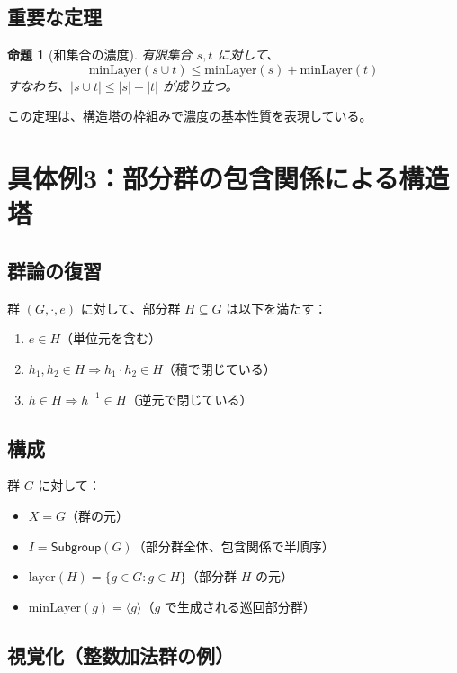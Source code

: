 \documentclass[a4paper,11pt]{ltjsarticle}
\newtheorem{proposition}[theorem]{命題}
\begin{document}
\subsection{重要な定理}

\begin{proposition}[和集合の濃度]
有限集合 $s, t$ に対して、
\[
\text{minLayer}(s \cup t) \leq \text{minLayer}(s) + \text{minLayer}(t)
\]
すなわち、$|s \cup t| \leq |s| + |t|$ が成り立つ。
\end{proposition}

この定理は、構造塔の枠組みで濃度の基本性質を表現している。

\newpage

\section{具体例3：部分群の包含関係による構造塔}

\subsection{群論の復習}

群 $(G, \cdot, e)$ に対して、部分群 $H \subseteq G$ は以下を満たす：
\begin{enumerate}
\item $e \in H$（単位元を含む）
\item $h_1, h_2 \in H \Rightarrow h_1 \cdot h_2 \in H$（積で閉じている）
\item $h \in H \Rightarrow h^{-1} \in H$（逆元で閉じている）
\end{enumerate}

\subsection{構成}

群 $G$ に対して：

\begin{itemize}
\item $X = G$（群の元）
\item $I = \mathsf{Subgroup}(G)$（部分群全体、包含関係で半順序）
\item $\text{layer}(H) = \{g \in G : g \in H\}$（部分群 $H$ の元）
\item $\text{minLayer}(g) = \langle g \rangle$（$g$ で生成される巡回部分群）
\end{itemize}

\subsection{視覚化（整数加法群の例）}
\end{document}

